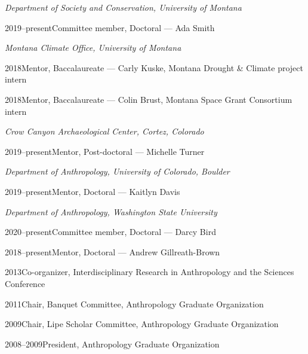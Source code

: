 \emph{Department of Society and Conservation, University of Montana}
\begin{list1}
\item[] 2019–present\hspace{.2cm}Committee member, Doctoral — Ada Smith
\end{list1}

\emph{Montana Climate Office, University of Montana}
\begin{list1}
\item[] 2018\hspace{.2cm}Mentor, Baccalaureate — Carly Kuske, Montana Drought \& Climate project intern
\item[] 2018\hspace{.2cm}Mentor, Baccalaureate — Colin Brust, Montana Space Grant Consortium intern
\end{list1}

\emph{Crow Canyon Archaeological Center, Cortez, Colorado}
\begin{list1}
\item[] 2019–present\hspace{.2cm}Mentor, Post-doctoral — Michelle Turner
\end{list1}


\emph{Department of Anthropology, University of Colorado, Boulder}
\begin{list1}
\item[] 2019–present\hspace{.2cm}Mentor, Doctoral — Kaitlyn Davis
\end{list1}

\emph{Department of Anthropology, Washington State University}
\begin{list1}
\item[] 2020–present\hspace{.2cm}Committee member, Doctoral — Darcy Bird
\item[] 2018–present\hspace{.2cm}Mentor, Doctoral — Andrew Gillreath-Brown
\item[] 2013\hspace{.2cm}Co-organizer, Interdisciplinary Research in Anthropology and the Sciences Conference
\item[] 2011\hspace{.2cm}Chair, Banquet Committee, Anthropology Graduate Organization
\item[] 2009\hspace{.2cm}Chair, Lipe Scholar Committee, Anthropology Graduate Organization
\item[] 2008–2009\hspace{.2cm}President, Anthropology Graduate Organization
\end{list1}

